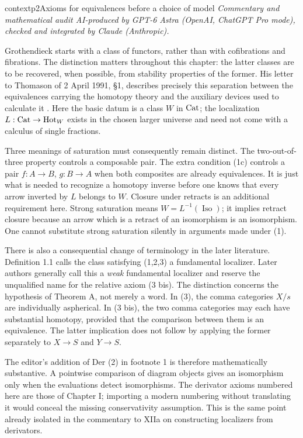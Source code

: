 \begin{dcomment}{context}{p2}{Axioms for equivalences before a choice of model}
\textit{Commentary and mathematical audit AI-produced by GPT-6 Astra (OpenAI, ChatGPT Pro mode), checked and integrated by Claude (Anthropic).}

Grothendieck starts with a class of functors, rather than with cofibrations and fibrations. The distinction matters throughout this chapter: the latter classes are to be recovered, when possible, from stability properties of the former. His letter to Thomason of 2 April 1991, \S1, describes precisely this separation between the equivalences carrying the homotopy theory and the auxiliary devices used to calculate it \citep{Grothendieck1991Letter}. Here the basic datum is a class $W$ in $\mathrm{Cat}$; the localization $L:\mathrm{Cat}\to\mathrm{Hot}_W$ exists in the chosen larger universe and need not come with a calculus of single fractions.

Three meanings of saturation must consequently remain distinct. The two-out-of-three property controls a composable pair. The extra condition (1c) controls a pair $f:A\to B$, $g:B\to A$ when both composites are already equivalences. It is just what is needed to recognize a homotopy inverse before one knows that every arrow inverted by $L$ belongs to $W$. Closure under retracts is an additional requirement here. Strong saturation means $W=L^{-1}(\operatorname{Iso})$; it implies retract closure because an arrow which is a retract of an isomorphism is an isomorphism. One cannot substitute strong saturation silently in arguments made under (1).

There is also a consequential change of terminology in the later literature. Definition 1.1 calls the class satisfying (1,2,3) a fundamental localizer. Later authors generally call this a \emph{weak} fundamental localizer and reserve the unqualified name for the relative axiom (3 bis). The distinction concerns the hypothesis of Theorem A, not merely a word. In (3), the comma categories $X/s$ are individually aspherical. In (3 bis), the two comma categories may each have substantial homotopy, provided that the comparison between them is an equivalence. The latter implication does not follow by applying the former separately to $X\to S$ and $Y\to S$.

The editor's addition of Der (2) in footnote 1 is therefore mathematically substantive. A pointwise comparison of diagram objects gives an isomorphism only when the evaluations detect isomorphisms. The derivator axioms numbered here are those of Chapter I; importing a modern numbering without translating it would conceal the missing conservativity assumption. This is the same point already isolated in the commentary to XIIa on constructing localizers from derivators.
\end{dcomment}



